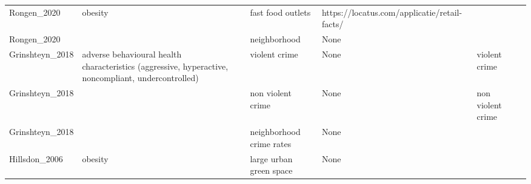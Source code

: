 \documentclass{article}
\begin{document}
\begin{table}
\begin{tabular}{lllllll}
Rongen\_2020     & obesity                                                                                             &         & fast food outlets                                                                             & https://locatus.com/applicatie/retail-facts/                                                                                                                                                     &                                       &          \\
Rongen\_2020     &                                                                                                     &         & neighborhood                                                                                  & None                                                                                                                                                                                             &                                       &          \\
Grinshteyn\_2018 & adverse behavioural health characteristics (aggressive, hyperactive, noncompliant, undercontrolled) &         & violent crime                                                                                 & None                                                                                                                                                                                             & violent crime                         &          \\
Grinshteyn\_2018 &                                                                                                     &         & non violent crime                                                                             & None                                                                                                                                                                                             & non violent crime                     &          \\
Grinshteyn\_2018 &                                                                                                     &         & neighborhood crime rates                                                                      & None                                                                                                                                                                                             &                                       &          \\
Hillsdon\_2006   & obesity                                                                                             &         & large urban green space                                                                       & None                                                                                                                                                                                             &                                       &          \\

\end{tabular}
\end{table}
\end{document}
